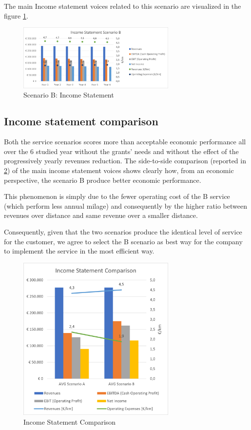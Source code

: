 The main Income statement voices related to this scenario are visualized in the figure \ref{fig:incstateB}.

\begin{figure}[h]
    \centering
    \includegraphics[width=0.7\textwidth]{Images/financial/income_statement_B.png}
    \caption{Scenario B: Income Statement}
    \label{fig:incstateB}
\end{figure}

\newpage

\subsection{Income statement comparison}
Both the service scenarios scores more than acceptable economic performance all over the 6 studied year without the grants’ needs and without the effect of the progressively yearly revenues reduction.
The side-to-side comparison (reported in \ref{fig:income_statement_comparison}) of the main income statement voices shows clearly how, from an economic perspective, the scenario B produce better economic performance. 

This phenomenon is simply due to the fewer operating cost of the B service (which perform less annual milage) and consequently by the higher ratio between revenues over distance and same revenue over a smaller distance. 

Consequently, given that the two scenarios produce the identical level of service for the customer, we agree to select the B scenario as best way for the company to implement the service in the most efficient way.

\begin{figure}[h]
    \centering
    \includegraphics[width=0.7\textwidth]{Images/financial/Comparison.png}
    \caption{Income Statement Comparison}
    \label{fig:income_statement_comparison}
\end{figure}

